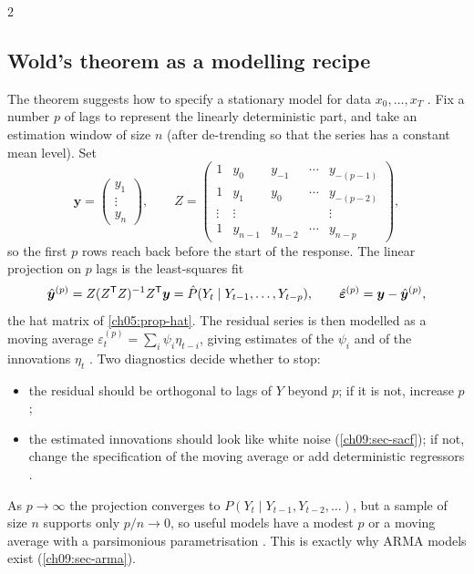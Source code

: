 \begin{paracol}{2}
\subsection{Wold's theorem as a modelling recipe}\label{ch09:sec-wold-recipe}
The theorem suggests how to specify a stationary model for data $x_0,\dots,x_T$
. Fix a number $p$ of lags to represent the linearly deterministic part, and take an
estimation window of size $n$ (after de-trending so that the series has a constant mean level). Set
\[
  \bm y=\begin{pmatrix}y_1\\ \vdots\\ y_n\end{pmatrix},\qquad
  Z=\begin{pmatrix}1&y_0&y_{-1}&\cdots&y_{-(p-1)}\\ 1&y_1&y_0&\cdots&y_{-(p-2)}\\
  \vdots&\vdots&&&\vdots\\ 1&y_{n-1}&y_{n-2}&\cdots&y_{n-p}\end{pmatrix},
\]
so the first $p$ rows reach back before the start of the response. The linear projection on $p$ lags is the least-squares fit
\[
  \hat{\bm y}^{(p)}=Z(Z^{\mathsf T} Z)^{-1}Z^{\mathsf T}\bm y=\hat P(Y_t\mid Y_{t-1},\dots,Y_{t-p}),\qquad
  \hat{\bm\varepsilon}^{(p)}=\bm y-\hat{\bm y}^{(p)},
\]
the hat matrix of \cref{ch05:prop-hat}. The residual series is then modelled as a moving average
$\varepsilon_t^{(p)}=\sum_i\psi_i\eta_{t-i}$, giving estimates of the $\psi_i$ and of the innovations $\eta_t$
. Two diagnostics decide whether to stop:
\begin{itemize}
  \item the residual should be orthogonal to lags of $Y$ beyond $p$; if it is not, increase $p$;
  \item the estimated innovations should look like white noise (\cref{ch09:sec-sacf}); if not, change the
        specification of the moving average or add deterministic regressors .
\end{itemize}
As $p\to\infty$ the projection converges to $P(Y_t\mid Y_{t-1},Y_{t-2},\dots)$, but a sample of size $n$
supports only $p/n\to0$, so useful models have a modest $p$ or a moving average with a
parsimonious parametrisation . This is exactly why ARMA models
exist (\cref{ch09:sec-arma}).


\end{paracol}
